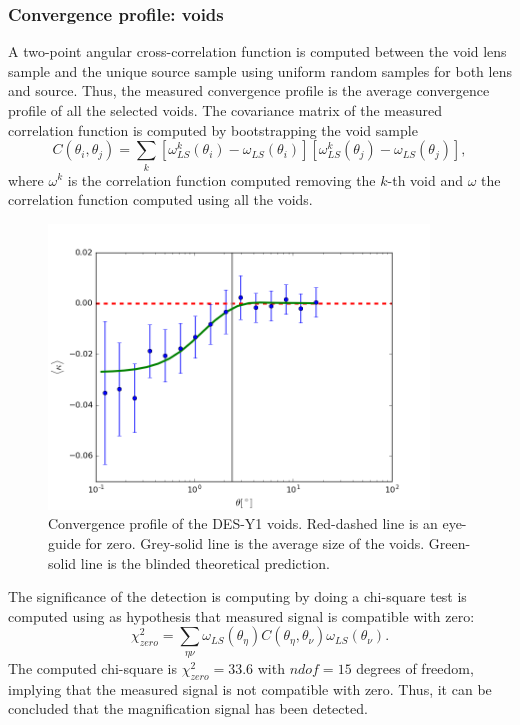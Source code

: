 \subsubsection{Convergence profile: voids}
A two-point angular cross-correlation function is computed between the void lens sample and the unique source sample using uniform random samples for both lens and source. Thus, the measured convergence profile is the average convergence profile of all the selected voids. The covariance matrix of the measured correlation function is computed by bootstrapping the void sample
\begin{equation}
C(\theta_i,\theta_j) = \sum\limits_k[\omega^k_{LS}(\theta_i)-\omega_{LS}(\theta_i)][\omega^k_{LS}(\theta_j)-\omega_{LS}(\theta_j)],
\end{equation}
where $\omega^k$ is the correlation function computed removing the $k$-th void and $\omega$ the correlation function computed using all the voids.
\begin{figure}
\begin{center}
\includegraphics[width=0.9\textwidth]{./figures_y1/void_stacked_mag_auto_i1.png}
\caption{Convergence profile of the DES-Y1 voids. Red-dashed line is an eye-guide for zero. Grey-solid line is the average size of the voids. Green-solid line is the blinded theoretical prediction.}
\label{fig:kappa_voids}
\end{center}
\end{figure}
\newline

The significance of the detection is computing by doing a chi-square test is computed using as hypothesis that measured signal is compatible with zero:
\begin{equation}
\chi^2_{zero} = \sum\limits_{\eta\nu} \omega_{LS}(\theta_\eta)C(\theta_\eta,\theta_\nu)\omega_{LS}(\theta_\nu).
\end{equation}
The computed chi-square is $\chi^2_{zero}=33.6$ with $ndof=15$ degrees of freedom, implying that the measured signal is not compatible with zero. Thus, it can be concluded that the magnification signal has been detected.
\newline

